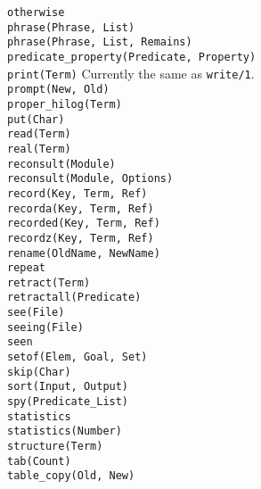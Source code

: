 \begin{tabbing}
 \> {\tt otherwise}		\>					\\
 \> {\tt phrase(Phrase, List)}	\>					\\
 \> {\tt phrase(Phrase, List, Remains)}	\>				\\
 \> {\tt predicate\_property(Predicate, Property)} \>			\\
 \> {\tt print(Term)}		\> Currently the same as {\tt write/1}.	\\
 \> {\tt prompt(New, Old)}	\>					\\
 \> {\tt proper\_hilog(Term)}	\>					\\
 \> {\tt put(Char)}		\>					\\
 \> {\tt read(Term)}		\>					\\
 \> {\tt real(Term)}		\>					\\
 \> {\tt reconsult(Module)}	\>					\\
 \> {\tt reconsult(Module, Options)} \>					\\
 \> {\tt record(Key, Term, Ref)} \>					\\
 \> {\tt recorda(Key, Term, Ref)} \>					\\
 \> {\tt recorded(Key, Term, Ref)} \>					\\
 \> {\tt recordz(Key, Term, Ref)} \>					\\
 \> {\tt rename(OldName, NewName)} \>					\\
 \> {\tt repeat}		\>					\\
 \> {\tt retract(Term)}		\>					\\
 \> {\tt retractall(Predicate)}	\>					\\
 \> {\tt see(File)}		\>					\\
 \> {\tt seeing(File)}		\>					\\
 \> {\tt seen}			\>					\\
 \> {\tt setof(Elem, Goal, Set)} \>					\\
 \> {\tt skip(Char)}		\>					\\
 \> {\tt sort(Input, Output)}	\>					\\
 \> {\tt spy(Predicate\_List)}	\>					\\
 \> {\tt statistics}		\>					\\
 \> {\tt statistics(Number)}	\>					\\
 \> {\tt structure(Term)}	\>					\\
 \> {\tt tab(Count)}		\>					\\
 \> {\tt table\_copy(Old, New)}	\>					\\

\end{tabbing}
